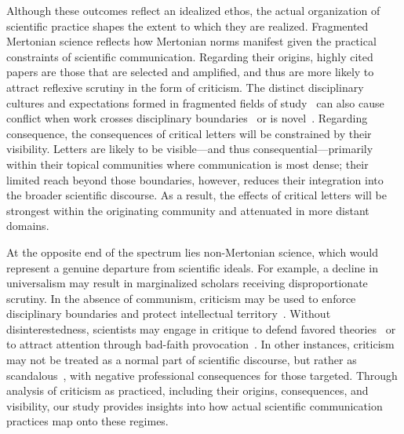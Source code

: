 \documentclass[12pt,a4paper]{article}
\numberwithin{equation}{section}
\begin{document}
Although these outcomes reflect an idealized ethos, the actual organization of scientific practice shapes the extent to which they are realized.
Fragmented Mertonian science reflects how Mertonian norms manifest given the practical constraints of scientific communication.
Regarding their origins, highly cited papers are those that are selected and amplified, and thus are more likely to attract reflexive scrutiny in the form of criticism. 
The distinct disciplinary cultures and expectations formed in fragmented fields of study~\cite{leydesdorff2001sociological,knorr1999epistemic} can also cause conflict when work crosses disciplinary boundaries~\cite{mcleish_2016_interdisciplinary, brohman_2016_interdisciplinary} or is novel~\cite{boudreau_2016_looking,li_2017_expertise,siler_2016_review,lane_2022_conservatism,ayoubi_2021_novel}.
Regarding consequence, the consequences of critical letters will be constrained by their visibility.
Letters are likely to be visible---and thus consequential---primarily within their topical communities where communication is most dense; their limited reach beyond those boundaries, however, reduces their integration into the broader scientific discourse. 
As a result, the effects of critical letters will be strongest within the originating community and attenuated in more distant domains.

At the opposite end of the spectrum lies non-Mertonian science, which would represent a genuine departure from scientific ideals.
For example, a decline in universalism may result in marginalized scholars receiving disproportionate scrutiny. 
In the absence of communism, criticism may be used to enforce disciplinary boundaries and protect intellectual territory~\cite{Gieryn1999, Klein2021}.
Without disinterestedness, scientists may engage in critique to defend favored theories~\cite{azoulay_2019_funeral} or to attract attention through bad-faith provocation~\cite{tannen2002agonism}.
In other instances, criticism may not be treated as a normal part of scientific discourse, but rather as scandalous~\cite{azoulay_2017_scandal}, with negative professional consequences for those targeted.
Through analysis of criticism as practiced, including their origins, consequences, and visibility, our study provides insights into how actual scientific communication practices map onto these regimes. 
\end{document}
